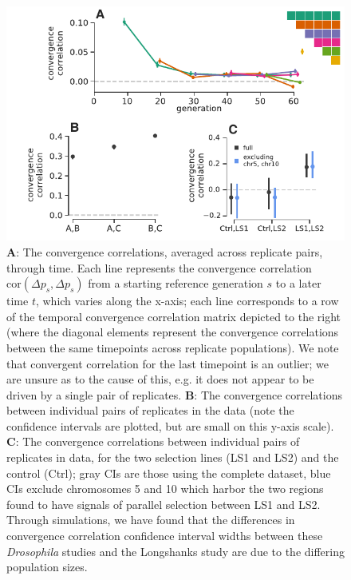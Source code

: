 \documentclass[11pt]{article}
\begin{document}
\begin{figure}[!htb]
  \centering
  \includegraphics[width=\textwidth]{figure-2-revision.pdf}

  \caption{{\bf A}: The convergence correlations, averaged across
    \textcite{Barghi2019-qy} replicate pairs, through time. Each line
    represents the convergence correlation $\mathrm{cor}(\Delta p_{s}, \Delta
    p_{s})$ from a starting reference generation $s$ to a later time $t$, which
    varies along the x-axis; each line corresponds to a row of the temporal
    convergence correlation matrix depicted to the right (where the
      diagonal elements represent the convergence correlations between the same
      timepoints across replicate populations). We note that convergent
      correlation for the last timepoint is an outlier; we are unsure as to the
      cause of this, e.g. it does not appear to be driven by a single pair of
      replicates. {\bf B}: The convergence correlations between individual
      pairs of replicates in the \textcite{Kelly2019-dc} data (note the
      confidence intervals are plotted, but are small on this y-axis scale).
      {\bf C}:  The convergence correlations between individual pairs of
      replicates in \parencite{Castro2019-uk} data, for the two selection lines
      (LS1 and LS2) and the control (Ctrl); gray CIs are those using the
      complete dataset, blue CIs exclude chromosomes 5 and 10 which harbor the
      two regions \textcite{Castro2019-uk} found to have signals of parallel
      selection between LS1 and LS2. Through simulations, we have found
        that the differences in convergence correlation confidence interval
        widths between these \emph{Drosophila} studies and the Longshanks study
        are due to the differing population sizes.}

  \label{fig:figure-2}
\end{figure}
\end{document}

